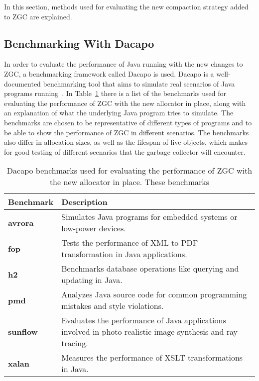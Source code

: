 In this section, methods used for evaluating the new compaction strategy added to ZGC are explained.

\subsection{Benchmarking With Dacapo}
In order to evaluate the performance of Java running with the new changes to ZGC, a benchmarking framework called Dacapo is used. Dacapo is a well-documented benchmarking tool that aims to simulate real scenarios of Java programs running~\cite{dacapo}. In Table~\ref{table:dacapo_benchmarks} there is a list of the benchmarks used for evaluating the performance of ZGC with the new allocator in place, along with an explanation of what the underlying Java program tries to simulate. The benchmarks are chosen to be representative of different types of programs and to be able to show the performance of ZGC in different scenarios. The benchmarks also differ in allocation sizes, as well as the lifespan of live objects, which makes for good testing of different scenarios that the garbage collector will encounter.

\begin{table}[H]
  \centering
  \begin{tabular}{|l|p{10cm}|}
    \hline
    \textbf{Benchmark} & \textbf{Description} \\ \hline
    \textbf{avrora} & Simulates Java programs for embedded systems or low-power devices. \\ \hline
    \textbf{fop} & Tests the performance of XML to PDF transformation in Java applications. \\ \hline
    \textbf{h2} & Benchmarks database operations like querying and updating in Java. \\ \hline
    \textbf{pmd} & Analyzes Java source code for common programming mistakes and style violations. \\ \hline
    \textbf{sunflow} & Evaluates the performance of Java applications involved in photo-realistic image synthesis and ray tracing. \\ \hline
    \textbf{xalan} & Measures the performance of XSLT transformations in Java. \\ \hline
  \end{tabular}
  \caption{Dacapo benchmarks used for evaluating the performance of ZGC with the new allocator in place. These benchmarks}
  \label{table:dacapo_benchmarks}
\end{table}

